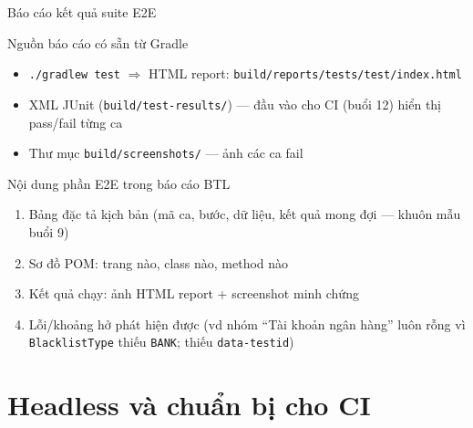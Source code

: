 \documentclass[aspectratio=169,12pt]{beamer}
\begin{document}
\begin{frame}{Báo cáo kết quả suite E2E}
  \vspace*{-0.6em}
  \begin{block}{Nguồn báo cáo có sẵn từ Gradle}
    \begin{itemize}
      \item \texttt{./gradlew test} $\Rightarrow$ HTML report:
            \texttt{build/reports/tests/test/index.html}
      \item XML JUnit (\texttt{build/test-results/}) --- đầu vào cho
            CI (buổi 12) hiển thị pass/fail từng ca
      \item Thư mục \texttt{build/screenshots/} --- ảnh các ca fail
    \end{itemize}
  \end{block}

  \begin{exampleblock}{Nội dung phần E2E trong báo cáo BTL}
    \begin{enumerate}
      \item Bảng đặc tả kịch bản (mã ca, bước, dữ liệu, kết quả
            mong đợi --- khuôn mẫu buổi 9)
      \item Sơ đồ POM: trang nào, class nào, method nào
      \item Kết quả chạy: ảnh HTML report + screenshot minh chứng
      \item Lỗi/khoảng hở phát hiện được (vd nhóm ``Tài khoản ngân
            hàng'' luôn rỗng vì \texttt{BlacklistType} thiếu
            \texttt{BANK}; thiếu \texttt{data-testid})
    \end{enumerate}
  \end{exampleblock}
\end{frame}

\section{Headless và chuẩn bị cho CI}
\end{document}
